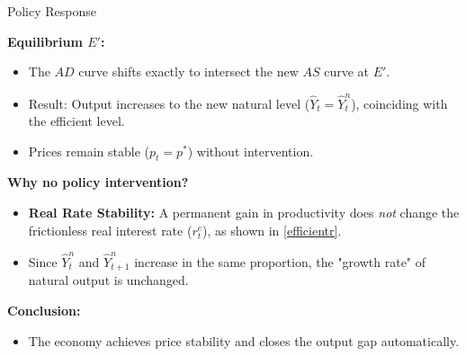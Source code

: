 \documentclass[11pt,aspectratio=169]{beamer}
\begin{document}
\begin{frame}[label=PermProdPolicy]{Policy Response}
\small

\textbf{Equilibrium $E'$:}
\begin{itemize}
    \item The $AD$ curve shifts exactly to intersect the new $AS$ curve at $E'$.
    \item Result: Output increases to the new natural level ($\hat{Y}_t = \hat{Y}_t^n$), coinciding with the efficient level.
    \item Prices remain stable ($p_t = p^{\ast}$) without intervention.
\end{itemize}

\textbf{Why no policy intervention?}
\begin{itemize}
    \item \textbf{Real Rate Stability:} A permanent gain in productivity does \emph{not} change the frictionless real interest rate ($r^e_t$), as shown in \eqref{efficientr}.
    \item Since $\hat{Y}_{t}^{n}$ and $\hat{Y}_{t+1}^{n}$ increase in the same proportion, the "growth rate" of natural output is unchanged.
\end{itemize}

\textbf{Conclusion:}
\begin{itemize}
    \item The economy achieves price stability and closes the output gap automatically.
\end{itemize}

\end{frame}
\end{document}
